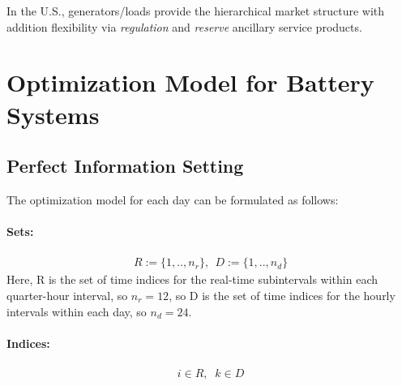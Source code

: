 \documentclass[11pt,twoside]{article}
\begin{document}
In the U.S., generators/loads provide the hierarchical market structure with addition flexibility via \emph{regulation} and \emph{reserve} ancillary service products. 

\section{Optimization Model for Battery Systems}\label{sec:model}
\subsection{Perfect Information Setting}
The optimization model for each day can be formulated as follows:\\
\paragraph{Sets:}
\begin{subequations}
\begin{align}
R := \{1,..,n_r\},\,\; D :=  \{1,..,n_d\}
\end{align}
\end{subequations}
Here, R is the set of time indices for the real-time subintervals within each quarter-hour interval, so $n_r=12$, so D is the set of time indices for the hourly intervals within each day, so $n_d=24$.\\
\paragraph{Indices:}
\begin{subequations}
\begin{align}
i \in R, \;\; k \in D
\end{align}
\end{subequations}
\end{document}
